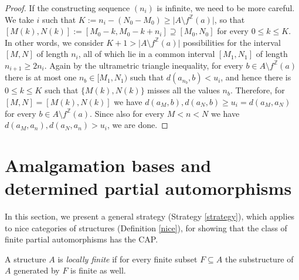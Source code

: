 \documentclass[oneside,notitlepage,12pt]{article}
\theoremstyle{definition}
\theoremstyle{remark}
\newcommand \set [1]{\{#1\}}
\newcommand \card [1] {\lvert#1\rvert} %
\newcommand \Z {\mathbb{Z}}
\begin{document}
\begin{proof}
    If the constructing sequence $(n_i)$ is infinite, we need to be more careful.
    We take $i$ such that $K := n_i - (N_0 - M_0) \geq \card{A \setminus f^\Z(a)}$, so that $[M(k), N(k)] := [M_0 - k, M_0 - k + n_i] \supseteq [M_0, N_0]$ for every $0 \leq k \leq K$.
    In other words, we consider $K + 1 > \card{A \setminus f^\Z(a)}$ possibilities for the interval $[M, N]$ of length $n_i$, all of which lie in a common interval $[M_1, N_1]$ of length $n_{i + 1} \geq 2n_i$.
    Again by the ultrametric triangle inequality, for every $b \in A \setminus f^\Z(a)$ there is at most one $n_b \in [M_1, N_1)$ such that $d(a_{n_b}, b) < u_i$, and hence there is $0 \leq k \leq K$ such that $\set{M(k), N(k)}$ misses all the values $n_b$.
    Therefore, for $[M, N] = [M(k), N(k)]$ we have $d(a_M, b), d(a_N, b) \geq u_i = d(a_M, a_N)$ for every $b \in A \setminus f^\Z(a)$.
    Since also for every $M < n < N$ we have $d(a_M, a_n), d(a_N, a_n) > u_i$, we are done.
\end{proof}




\color{black}





\section{Amalgamation bases and determined partial automorphisms}

In this section, we present a general strategy (Strategy \ref{strategy}), which applies to nice categories of structures (Definition \ref{nice}), for showing that the class of finite partial automorphisms has the CAP.






A structure $A$ is \emph{locally finite} if for every finite subset $F \subseteq A$ the substructure of $A$ generated by $F$ is finite as well.
\end{document}
